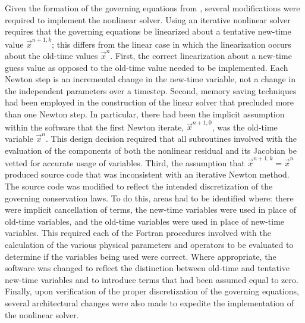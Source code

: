 Given the formation of the governing equations from , several modifications were required to implement the nonlinear solver.
Using an iterative nonlinear solver requires that the governing equations be linearized about a tentative new-time value $\vec{x}^{n+1, k}$; this differs from the linear case in which the linearization occurs about the old-time values $\vec{x}^{n}$.
First, the correct linearization about a new-time guess value as opposed to the old-time value needed to be implemented.
Each Newton step is an incremental change in the new-time variable, not a change in the independent parameters over a timestep.
Second, memory saving techniques had been employed in the construction of the linear solver that precluded more than one Newton step.
In particular, there had been the implicit assumption within the software that the first Newton iterate, $\vec{x}^{n+1, 0}$, was the old-time variable $\vec{x}^{n}$.
This design decision required that all subroutines involved with the evaluation of the components of both the nonlinear residual and its Jacobian be vetted for accurate usage of variables.
Third, the assumption that $\vec{x}^{n+1, k} = \vec{x}^{n}$ produced source code that was inconsistent with an iterative Newton method.
The source code was modified to reflect the intended discretization of the governing conservation laws.
To do this, areas had to be identified where: there were implicit cancellation of terms, the new-time variables were used in place of old-time variables, and the old-time variables were used in place of new-time variables.
This required each of the Fortran procedures involved with the calculation of the various physical parameters and operators to be evaluated to determine if the variables being used were correct.
Where appropriate, the software was changed to reflect the distinction between old-time and tentative new-time variables and to introduce terms that had been assumed equal to zero.
Finally, upon verification of the proper discretization of the governing equations, several architectural changes were also made to expedite the implementation of the nonlinear solver.

